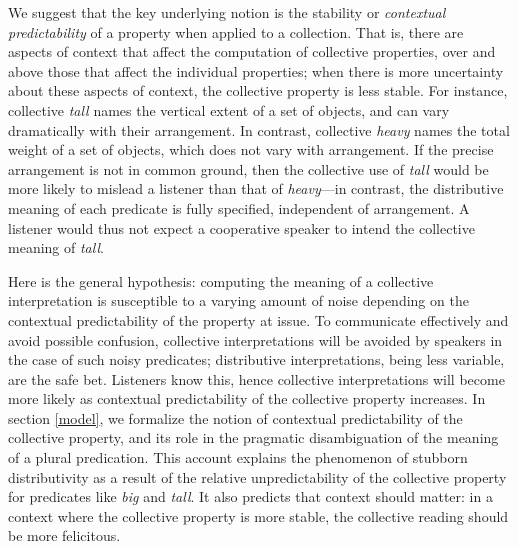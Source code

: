 \documentclass[linguex]{sp}
\begin{document}
We suggest that the key underlying notion is the stability or \emph{contextual predictability} of a property when applied to a collection.
That is, there are aspects of context that affect the computation of collective properties, over and above those that affect the individual properties; when there is more uncertainty about these aspects of context, the collective property is less stable.
For instance, collective \emph{tall} names the vertical extent of a set of objects, and can vary dramatically with their arrangement.
In contrast, collective \emph{heavy} names the total weight of a set of objects, which does not vary with arrangement. 
If the precise arrangement is not in common ground, then the collective use of \emph{tall} would be more likely to mislead a listener than that of \emph{heavy}---in contrast, the distributive meaning of each predicate is fully specified, independent of arrangement. A listener would thus not expect a cooperative speaker to intend the collective meaning of \emph{tall}.

Here is the general hypothesis: computing the meaning of a collective interpretation is susceptible to a varying amount of noise depending on the contextual predictability of the property at issue.
To communicate effectively and avoid possible confusion, collective interpretations will be avoided by speakers in the case of such noisy predicates; distributive interpretations, being less variable, are the safe bet. 
Listeners know this, hence collective interpretations will become more likely as contextual predictability of the collective property increases.
In section \ref{model}, we formalize the notion of contextual predictability of the collective property, and its role in the pragmatic disambiguation of the meaning of a plural predication.
This account explains the phenomenon of stubborn distributivity as a result of the relative unpredictability of the collective property for predicates like \emph{big} and \emph{tall}.
It also predicts that context should matter: in a context where the collective property is more stable, the collective reading should be more felicitous.
\end{document}
